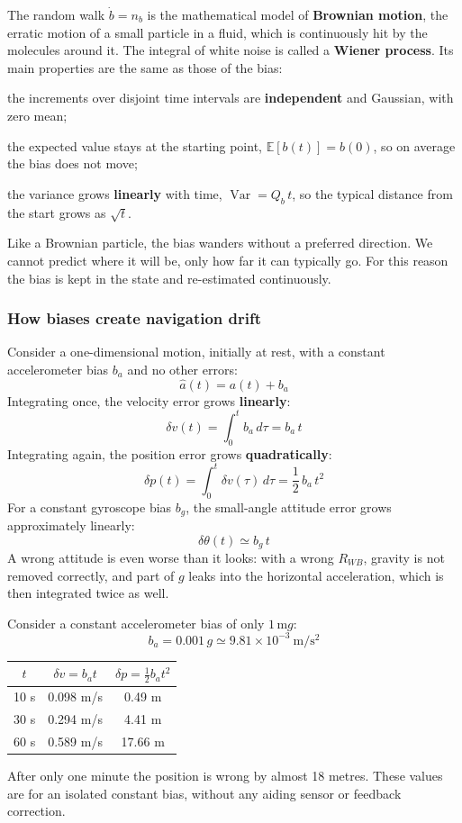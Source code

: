 \begin{infobox}
The random walk $\dot b = n_b$ is the mathematical model of \textbf{Brownian motion}, the erratic motion of a small particle in a fluid, which is continuously hit by the molecules around it. The integral of white noise is called a \textbf{Wiener process}. Its main properties are the same as those of the bias:
\begin{compactitemize}
    \item the increments over disjoint time intervals are \textbf{independent} and Gaussian, with zero mean;
    \item the expected value stays at the starting point, $\mathbb{E}[b(t)] = b(0)$, so on average the bias does not move;
    \item the variance grows \textbf{linearly} with time, $\operatorname{Var} = Q_b\, t$, so the typical distance from the start grows as $\sqrt{t}$.
\end{compactitemize}
Like a Brownian particle, the bias wanders without a preferred direction. We cannot predict where it will be, only how far it can typically go. For this reason the bias is kept in the state and re-estimated continuously.
\end{infobox}

\subsubsection{How biases create navigation drift}
Consider a one-dimensional motion, initially at rest, with a constant accelerometer bias $b_a$ and no other errors:
\[
\hat a(t) = a(t) + b_a
\]
Integrating once, the velocity error grows \textbf{linearly}:
\[
\delta v(t) = \int_0^t b_a\, d\tau = b_a\, t
\]
Integrating again, the position error grows \textbf{quadratically}:
\[
\boxed{\delta p(t) = \int_0^t \delta v(\tau)\, d\tau = \frac{1}{2}\, b_a\, t^2}
\]
For a constant gyroscope bias $b_g$, the small-angle attitude error grows approximately linearly:
\[
\delta\theta(t) \simeq b_g\, t
\]
A wrong attitude is even worse than it looks: with a wrong $R_{WB}$, gravity is not removed correctly, and part of $g$ leaks into the horizontal acceleration, which is then integrated twice as well.

\begin{examplebox}
Consider a constant accelerometer bias of only $1\,\mathrm{m}g$:
\[
b_a = 0.001\, g \simeq 9.81 \times 10^{-3}\ \mathrm{m/s^2}
\]
\begin{center}
\begin{tabular}{c|c|c}
$t$ & $\delta v = b_a t$ & $\delta p = \frac{1}{2} b_a t^2$ \\ \hline
10 s & 0.098 m/s & 0.49 m \\
30 s & 0.294 m/s & 4.41 m \\
60 s & 0.589 m/s & 17.66 m
\end{tabular}
\end{center}
After only one minute the position is wrong by almost 18 metres. These values are for an isolated constant bias, without any aiding sensor or feedback correction.
\end{examplebox}

